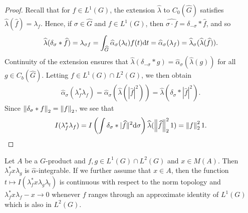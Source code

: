 \begin{proof}
	Recall that for $f \in L^1(G)$, the extension $\hat \lambda$ to $C_0(\hat G)$ satisfies $\hat \lambda(\hat f) = \lambda_f$. Hence, if $\sigma \in \hat G$ and $f \in L^1(G)$, then $\hat {\sigma \cdot f } = \delta_{-\sigma} \ast \hat f$, and so
	\begin{align*}
		\widehat{\lambda} (\delta_\sigma \ast \widehat{f}) = \lambda_{\sigma f} = \int_{\widehat{G}} \widehat{\alpha}_\sigma(\lambda_t) f(t) \mathrm{d} t  = \widehat{\alpha}_\sigma ( \lambda_f) = \widehat{\lambda}_\sigma ( \widehat{\lambda}(\widehat{f})).
	\end{align*}
	Continuity of the extension ensures that $\hat \lambda(\delta_{-\sigma} \ast g) = \hat \alpha_{\sigma}(\hat \lambda(g))$ for all $g \in C_b(\hat G)$. Letting $f \in L^1(G) \cap L^2(G)$, we then obtain
	\begin{align*}
	\hat \alpha_\sigma(\lambda_f^* \lambda_f) = \hat \alpha_\sigma(\hat \lambda( | \hat f | ^2)) = \hat \lambda(\delta_\sigma \ast | \hat f |^2).		
	\end{align*}
	Since $\left\lVert \delta_\sigma \ast f \right\rVert_2 = \left\lVert f \right\rVert_2$, we see that
	\begin{align*}
		I(\lambda_f^* \lambda_f) = I\left( \int \delta_\sigma \ast | \widehat{f} \|^2 \mathrm{d} \sigma \right) \widehat{\lambda} (\left\lVert \widehat{f} \right\rVert_2^2 1) = \left\lVert f \right\rVert_2^2 1.
	\end{align*}
\end{proof}
\begin{lemma}
	Let $A$ be a $G$-product and $f,g \in L^1(G) \cap L^2(G)$ and $x \in M(A)$. Then $ \lambda_f^* x \lambda_g$ is $\hat \alpha$-integrable. If we further assume that $x \in A$, then the function $t \mapsto I(\lambda_f^* x \lambda_g \lambda_t)$ is continuous with respect to the norm topology and $\lambda_f^* x \lambda_f - x \to 0$ whenever $f$ ranges through an approximate identity of $L^1(G)$ which is also in $L^2(G)$.
	\label{olpe1lemma2.7}
\end{lemma}
